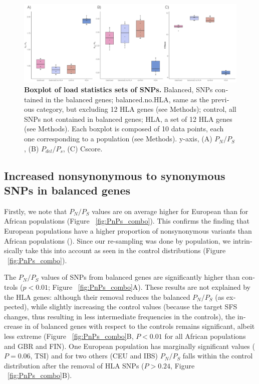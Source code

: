 \begin{refsection}
\begin{otherlanguage}{english}

\begin{figure}
\includegraphics[]{chap3_folder/figures/logMAF_bins.png}
\caption{\textbf{Boxplot of load statistics sets of SNPs.}
Balanced, SNPs contained in the balanced genes; balanced.no.HLA, same as the previous category, but excluding 12 HLA genes (see Methods); control, all SNPs not contained in balanced genes; HLA, a set of 12 HLA genes (see Methods). Each boxplot is composed of 10 data points, each one corresponding to a population (see Methods). y-axis, (A) $P_{N}/P_{S}$, (B) $P_{del}/P_{s}$, (C) Cscore.
}
\label{fig:logMAF_bins}
\end{figure}
%

\afterpage{\FloatBarrier}
\subsection{Increased nonsynonymous to synonymous SNPs in balanced genes}  
Firstly, we note that $P_{N}/P_{S}$ values are on average higher for European than for African populations (Figure ~\ref{fig:PnPs_combo}). This confirms the finding that European populations have a higher proportion of nonsynonymous variants than African populations (\cite{Lohmueller2008}). Since our re-sampling was done by population, we intrinsically take this into account as seen in the control distributions (Figure ~\ref{fig:PnPs_combo}).

The $P_{N}/P_{S}$ values of SNPs from balanced genes are significantly higher than controls ($p<0.01$; Figure ~\ref{fig:PnPs_combo}A). These results are not explained by the HLA genes: although their removal reduces the balanced $P_{N}/P_{S}$ (as expected), while slightly increasing the control values (because the target SFS changes, thus resulting in less intermediate frequencies in the controls), the increase in of balanced genes with respect to the controls remains significant, albeit less extreme (Figure ~\ref{fig:PnPs_combo}B, $P<0.01$ for all African populations and GBR and FIN). One European population has marginally significant values ($P=0.06$, TSI) and for two others (CEU and IBS) $P_{N}/P_{S}$ falls within the control distribution after the removal of HLA SNPs ($P>0.24$, Figure ~\ref{fig:PnPs_combo}B).


\end{otherlanguage}
\end{refsection}
